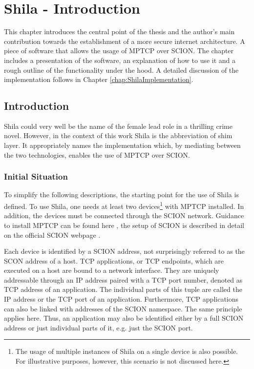 
\chapter{Shila - Introduction}
\label{chap:ShilaIntroduction}

This chapter introduces the central point of the thesis and the author's main contribution towards the establishment of a more secure internet architecture. A piece of software that allows the usage of MPTCP over SCION. The chapter includes a presentation of the software, an explanation of how to  use it and a rough outline of the functionality under the hood. A detailed discussion of the implementation follows in Chapter \ref{chap:ShilaImplementation}.   

\section{Introduction}
\label{sec:ShilaIntroduction}

Shila could very well be the name of the female lead role in a thrilling crime novel. However, in the context of this work Shila is the abbreviation of shim layer. It appropriately names the implementation which, by mediating between the two technologies, enables the use of MPTCP over SCION.

\subsection*{Initial Situation}
\label{subsec:ShilaInitialSituation}

To simplify the following descriptions, the starting point for the use of Shila is defined. To use Shila, one needs at least two devices\footnote{The usage of multiple instances of Shila on a single device is also possible. For illustrative purposes, however, this scenario is not discussed here.} with MPTCP installed. In addition, the devices must be connected through the SCION network. Guidance to install MPTCP can be found here \cite{MPTCPWebMain}, the setup of SCION is described in detail on the official SCION webpage \cite{SCIONWebMain}.

Each device is identified by a SCION address, not surprisingly referred to as the SCON address of a host. TCP applications, or TCP endpoints, which are executed on a host are bound to a network interface. They are uniquely addressable through an IP address paired with a TCP port number, denoted as TCP address of an application. The individual parts of this tuple are called the IP address or the TCP port of an application. Furthermore, TCP applications can also be linked with addresses of the SCION namespace. The same principle applies here. Thus, an application may also be identified either by a full SCION address or just individual parts of it, e.g. just the SCION port.

